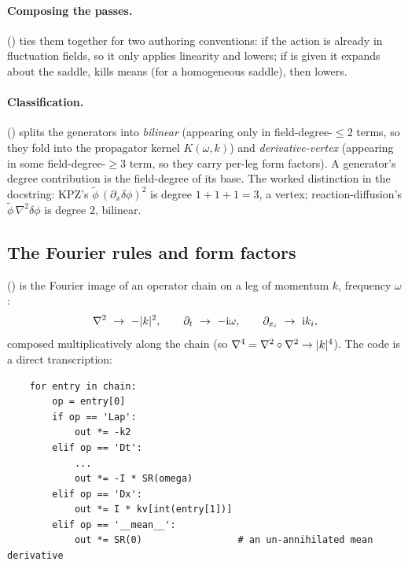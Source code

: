 \paragraph{Composing the passes.}
() ties them together for two authoring
conventions: if  the action is already in fluctuation
fields, so it only applies linearity and lowers; if  is given
it expands about the saddle, kills means (for a homogeneous saddle), then lowers.

\paragraph{Classification.}
() splits the generators into \emph{bilinear}
(appearing only in field-degree-$\le2$ terms, so they fold into the propagator
kernel $K(\omega,k)$) and \emph{derivative-vertex} (appearing in some
field-degree-$\ge3$ term, so they carry per-leg form factors). A generator's
degree contribution is the field-degree of its base. The worked distinction in
the docstring: KPZ's $\tilde\phi\,(\partial_{x}\delta\phi)^{2}$ is degree
$1+1+1=3$, a vertex; reaction-diffusion's $\tilde\phi\,\nabla^{2}\delta\phi$ is
degree $2$, bilinear.

\subsection{The Fourier rules and form factors}

 ()
is the Fourier image of an operator chain on a leg of momentum $k$, frequency
$\omega$:
\begin{equation}
  \nabla^2\ \to\ -|k|^{2},\qquad
  \partial_{t}\ \to\ -\mathrm{i}\omega,\qquad
  \partial_{x_{i}}\ \to\ \mathrm{i} k_{i},
  \label{eq:fourierrules}
\end{equation}
composed multiplicatively along the chain (so $\nabla^{4}=\nabla^2\circ\nabla^2\to|k|^{4}$).
The code is a direct transcription:

\begin{lstlisting}
    for entry in chain:
        op = entry[0]
        if op == 'Lap':
            out *= -k2
        elif op == 'Dt':
            ...
            out *= -I * SR(omega)
        elif op == 'Dx':
            out *= I * kv[int(entry[1])]
        elif op == '__mean__':
            out *= SR(0)                 # an un-annihilated mean derivative
\end{lstlisting}

